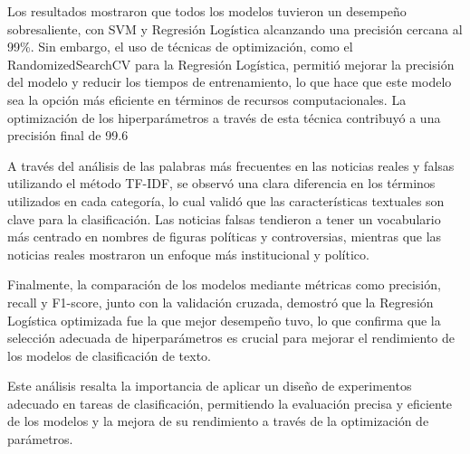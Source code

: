 \documentclass[journal]{IEEEtran}
\begin{document}
Los resultados mostraron que todos los modelos tuvieron un desempeño sobresaliente, con SVM y Regresión Logística alcanzando una precisión cercana al 99\%. Sin embargo, el uso de técnicas de optimización, como el RandomizedSearchCV para la Regresión Logística, permitió mejorar la precisión del modelo y reducir los tiempos de entrenamiento, lo que hace que este modelo sea la opción más eficiente en términos de recursos computacionales. La optimización de los hiperparámetros a través de esta técnica contribuyó a una precisión final de 99.6%

A través del análisis de las palabras más frecuentes en las noticias reales y falsas utilizando el método TF-IDF, se observó una clara diferencia en los términos utilizados en cada categoría, lo cual validó que las características textuales son clave para la clasificación. Las noticias falsas tendieron a tener un vocabulario más centrado en nombres de figuras políticas y controversias, mientras que las noticias reales mostraron un enfoque más institucional y político.

Finalmente, la comparación de los modelos mediante métricas como precisión, recall y F1-score, junto con la validación cruzada, demostró que la Regresión Logística optimizada fue la que mejor desempeño tuvo, lo que confirma que la selección adecuada de hiperparámetros es crucial para mejorar el rendimiento de los modelos de clasificación de texto.

Este análisis resalta la importancia de aplicar un diseño de experimentos adecuado en tareas de clasificación, permitiendo la evaluación precisa y eficiente de los modelos y la mejora de su rendimiento a través de la optimización de parámetros.
\ifCLASSOPTIONcaptionsoff
  \newpage
\fi





%
%
%

\end{document}
